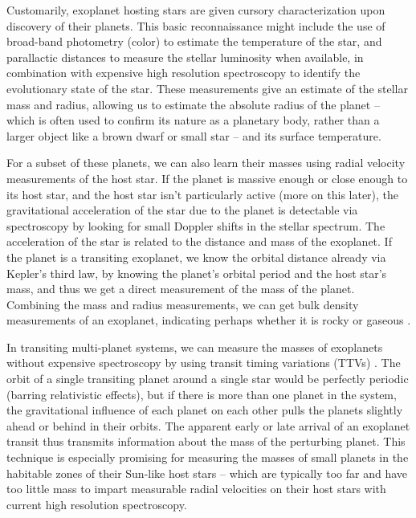 Customarily, exoplanet hosting stars are given cursory characterization upon discovery of their planets. This basic reconnaissance might include the use of broad-band photometry (color) to estimate the temperature of the star, and parallactic distances to measure the stellar luminosity when available, in combination with expensive high resolution spectroscopy to identify the evolutionary state of the star. These measurements give an estimate of the stellar mass and radius, allowing us to estimate the absolute radius of the planet -- which is often used to confirm its nature as a planetary body, rather than a larger object like a brown dwarf or small star -- and its surface temperature. 

For a subset of these planets, we can also learn their masses using radial velocity measurements of the host star. If the planet is massive enough or close enough to its host star, and the host star isn't particularly active (more on this later), the gravitational acceleration of the star due to the planet is detectable via spectroscopy by looking for small Doppler shifts in the stellar spectrum. The acceleration of the star is related to the distance and mass of the exoplanet. If the planet is a transiting exoplanet, we know the orbital distance already via Kepler's third law, by knowing the planet's orbital period and the host star's mass, and thus we get a direct measurement of the mass of the planet. Combining the mass and radius measurements, we can get bulk density measurements of an exoplanet, indicating perhaps whether it is rocky or gaseous \citep{Seager2007}. 

In transiting multi-planet systems, we can measure the masses of exoplanets without expensive spectroscopy by using transit timing variations (TTVs) \citep{Agol2005,Holman2005}. The orbit of a single transiting planet around a single star would be perfectly periodic (barring relativistic effects), but if there is more than one planet in the system, the gravitational influence of each planet on each other pulls the planets slightly ahead or behind in their orbits. The apparent early or late arrival of an exoplanet transit thus transmits information about the mass of the perturbing planet. This technique is especially promising for measuring the masses of small planets in the habitable zones of their Sun-like host stars -- which are typically too far and have too little mass to impart measurable radial velocities on their host stars with current high resolution spectroscopy. 

